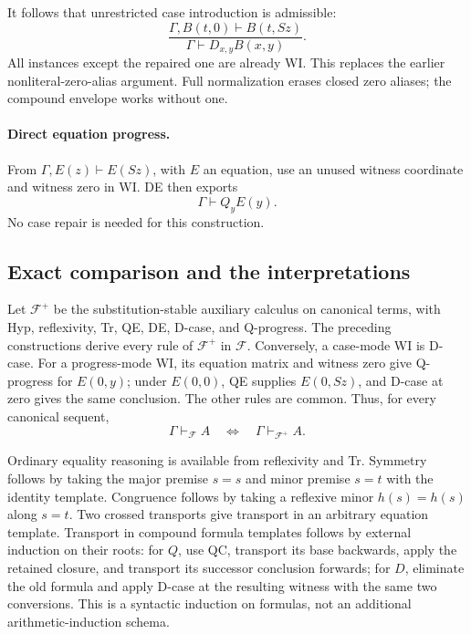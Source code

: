 It follows that unrestricted case introduction is admissible:
\[
 \frac{\Gamma,B(t,0)\vdash B(t,Sz)}
      {\Gamma\vdash D_{x,y}B(x,y)}.
 \tag{D-case}\label{env:dcase}
\]
All instances except the repaired one are already WI. This replaces the
earlier nonliteral-zero-alias argument. Full normalization erases closed
zero aliases; the compound envelope works without one.

\paragraph{Direct equation progress.}
From $\Gamma,E(z)\vdash E(Sz)$, with $E$ an equation, use an unused
witness coordinate and witness zero in WI. DE then exports
\[
 \Gamma\vdash Q_yE(y).
 \tag{Q-progress}\label{env:qprog}
\]
No case repair is needed for this construction.

\subsection{Exact comparison and the interpretations}

Let $\mathcal F^+$ be the substitution-stable auxiliary calculus on canonical
terms, with Hyp, reflexivity, Tr, QE, DE, D-case, and Q-progress. The
preceding constructions derive every rule of $\mathcal F^+$ in
$\mathcal F$. Conversely, a case-mode WI is D-case. For a progress-mode
WI, its equation matrix and witness zero give Q-progress for $E(0,y)$;
under $E(0,0)$, QE supplies $E(0,Sz)$, and D-case at zero gives the same
conclusion. The other rules are common. Thus, for every canonical sequent,
\[
 \Gamma\vdash_{\mathcal F}A
 \quad\Longleftrightarrow\quad
 \Gamma\vdash_{\mathcal F^+}A.
 \tag{Exact consequence}\label{env:consequence}
\]

Ordinary equality reasoning is available from reflexivity and Tr.
Symmetry follows by taking the major premise $s=s$ and minor premise
$s=t$ with the identity template. Congruence follows by taking a
reflexive minor $h(s)=h(s)$ along $s=t$. Two crossed transports give
transport in an arbitrary equation template. Transport in compound
formula templates follows by external induction on their roots: for $Q$,
use QC, transport its base backwards, apply the retained closure, and
transport its successor conclusion forwards; for $D$, eliminate the old
formula and apply D-case at the resulting witness with the same two
conversions. This is a syntactic induction on formulas, not an additional
arithmetic-induction schema.

